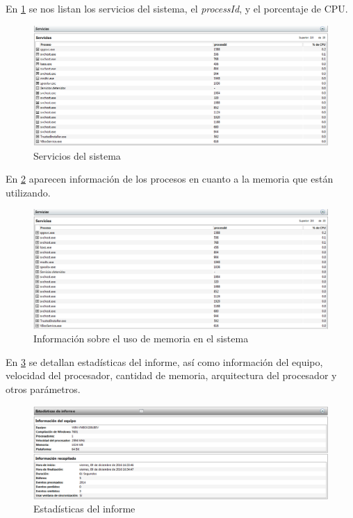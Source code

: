 En \ref{cuestion4-servicios} se nos listan los servicios del sistema, el \textit{processId}, y el porcentaje de CPU.

\begin{figure}[H]
	\centering
	\includegraphics[scale=0.35]{cuestion4-4.png}
	\caption{Servicios del sistema} \label{cuestion4-servicios}
\end{figure}

En \ref{cuestion4-memoria} aparecen información de los procesos en cuanto a la memoria que están utilizando.

\begin{figure}[H]
	\centering
	\includegraphics[scale=0.35]{cuestion4-5.png}
	\caption{Información sobre el uso de memoria en el sistema} \label{cuestion4-memoria}
\end{figure}

En \ref{cuestion4-estadisticas} se detallan estadísticas del informe, así como información del equipo, velocidad del procesador, cantidad de memoria, arquitectura del procesador y otros parámetros.

\begin{figure}[H]
	\centering
	\includegraphics[scale=0.35]{cuestion4-7.png}
	\caption{Estadísticas del informe} \label{cuestion4-estadisticas}
\end{figure}

